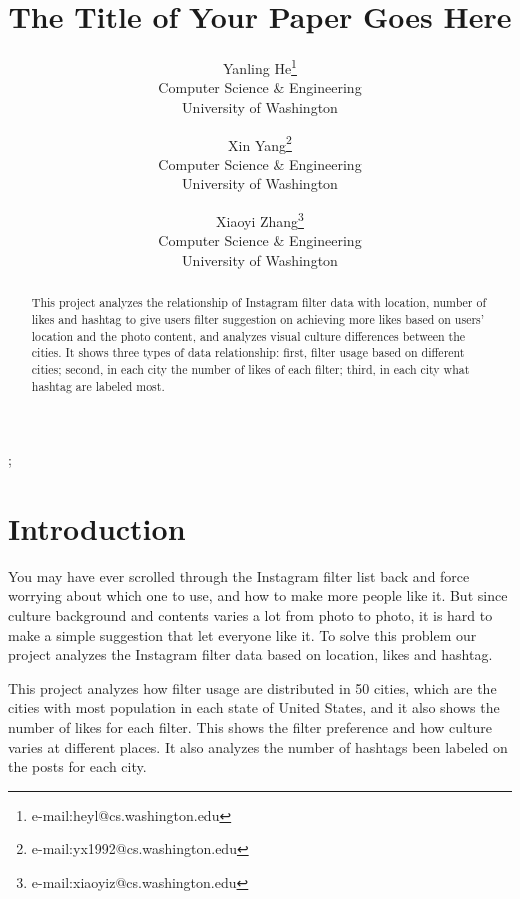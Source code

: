\documentclass[conference]{acmsiggraph}
\title{The Title of Your Paper Goes Here}
\author{Yanling He\thanks{e-mail:heyl@cs.washington.edu}\\Computer Science \& Engineering\\University of Washington
\and
Xin Yang\thanks{e-mail:yx1992@cs.washington.edu}\\Computer Science \& Engineering\\University of Washington
\and
Xiaoyi Zhang\thanks{e-mail:xiaoyiz@cs.washington.edu}\\Computer Science \& Engineering\\University of Washington
}
\begin{document}

\maketitle

\begin{abstract}

This project analyzes the relationship of Instagram filter data with location, number of likes and hashtag to give users filter suggestion on achieving more likes based on users' location and the photo content, and analyzes visual culture differences between the cities. It shows three types of data relationship: first, filter usage based on different cities; second, in each city the number of likes of each filter; third, in each city what hashtag are labeled most.

\end{abstract}

\begin{CRcatlist}
  ;
\end{CRcatlist}

\keywordlist


\TOGlinkslist


\copyrightspace

\section{Introduction}

You may have ever scrolled through the Instagram filter list back and force worrying about which one to use, and how to make more people like it. But since culture background and contents varies a lot from photo to photo, it is hard to make a simple suggestion that let everyone like it. To solve this problem our project analyzes the Instagram filter data based on location, likes and hashtag.

This project analyzes how filter usage are distributed in 50 cities, which are the cities with most population in each state of United States, and it also shows the number of likes for each filter. This shows the filter preference and how culture varies at different places. It also analyzes the number of hashtags been labeled on the posts for each city. 
\end{document}
